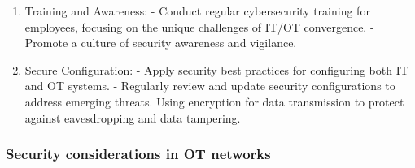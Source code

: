 \begin{enumerate}
  \item Training and Awareness:
   - Conduct regular cybersecurity training for employees, focusing on the unique challenges of IT/OT convergence.
   - Promote a culture of security awareness and vigilance.

   \item Secure Configuration:
   - Apply security best practices for configuring both IT and OT systems.
   - Regularly review and update security configurations to address emerging threats. Using encryption for data transmission to protect against eavesdropping and data tampering.
   
\end{enumerate}

\subsubsection{Security considerations in OT networks}

